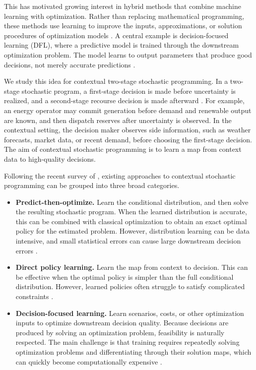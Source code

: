 \documentclass{article}
\newcommand{\1}{\mathbf{1}}
\theoremstyle{plain}
\theoremstyle{definition}
\theoremstyle{remark}
\begin{document}
This has motivated growing interest in hybrid methods that combine machine learning with optimization. Rather than replacing mathematical programming, these methods use learning to improve the inputs, approximations, or solution procedures of optimization models \citep{bengio2021machine,kotary2021endtoend,mandi2024decision}. A central example is decision-focused learning (DFL), where a predictive model is trained through the downstream optimization problem. The model learns to output parameters that produce good decisions, not merely accurate predictions \citep{donti2017task,elmachtoub2022smart,wilder2019melding}.

We study this idea for contextual two-stage stochastic programming. In a two-stage stochastic program, a first-stage decision is made before uncertainty is realized, and a second-stage recourse decision is made afterward \citep{birge2011introduction,shapiro2014lectures}. For example, an energy operator may commit generation before demand and renewable output are known, and then dispatch reserves after uncertainty is observed. In the contextual setting, the decision maker observes side information, such as weather forecasts, market data, or recent demand, before choosing the first-stage decision. The aim of contextual stochastic programming is to learn a map from context data to high-quality decisions.

Following the recent survey of \citet{sadana2025survey}, existing approaches to contextual stochastic programming can be grouped into three broad categories.

\begin{itemize}
    \item \textbf{Predict-then-optimize.} Learn the conditional distribution, and then solve the resulting stochastic program. When the learned distribution is accurate, this can be combined with classical optimization to obtain an exact optimal policy for the estimated problem. However, distribution learning can be data intensive, and small statistical errors can cause large downstream decision errors \citep{elmachtoub2022smart,donti2017task}.

    \item \textbf{Direct policy learning.} Learn the map from context to decision. This can be effective when the optimal policy is simpler than the full conditional distribution. However, learned policies often struggle to satisfy complicated constraints \citep{kotary2021endtoend}.

    \item \textbf{Decision-focused learning.} Learn scenarios, costs, or other optimization inputs to optimize downstream decision quality. Because decisions are produced by solving an optimization problem, feasibility is naturally respected. The main challenge is that training requires repeatedly solving optimization problems and differentiating through their solution maps, which can quickly become computationally expensive \citep{amos2017optnet,agrawal2019differentiable,mandi2024decision}.
\end{itemize}
\end{document}
